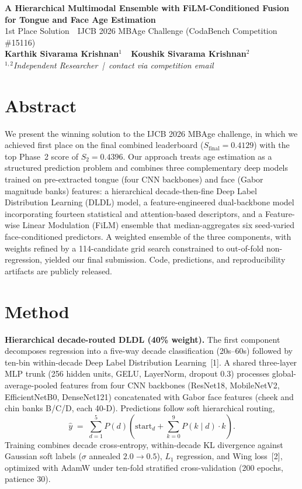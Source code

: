 \documentclass[9pt,letterpaper]{extarticle}
\begin{document}
\begin{center}
{\normalsize\bfseries\color{navyblue}
A Hierarchical Multimodal Ensemble with FiLM-Conditioned Fusion\\
for Tongue and Face Age Estimation}\\[2pt]
{\footnotesize\color{captiongray}
1st Place Solution \,\textperiodcentered\, IJCB 2026 MBAge Challenge
(CodaBench Competition \#15116)}\\[4pt]
{\small\bfseries
Karthik Sivarama Krishnan$^{1}$ \,\textperiodcentered\, Koushik Sivarama Krishnan$^{2}$}\\[1pt]
{\footnotesize\itshape
$^{1,2}$Independent Researcher \,|\, contact via competition email}
\end{center}

\section*{Abstract}
We present the winning solution to the IJCB 2026 MBAge challenge, in which we
achieved first place on the final combined leaderboard ($S_{\mathrm{final}}=0.4129$)
with the top Phase~2 score of $S_{2}=0.4396$. Our approach treats age estimation
as a structured prediction problem and combines three complementary deep models
trained on pre-extracted tongue (four CNN backbones) and face (Gabor magnitude
banks) features: a hierarchical decade-then-fine Deep Label Distribution Learning
(DLDL) model, a feature-engineered dual-backbone model incorporating fourteen
statistical and attention-based descriptors, and a Feature-wise Linear Modulation
(FiLM) ensemble that median-aggregates six seed-varied face-conditioned
predictors. A weighted ensemble of the three components, with weights refined
by a 114-candidate grid search constrained to out-of-fold non-regression, yielded
our final submission. Code, predictions, and reproducibility artifacts are
publicly released.

\section*{Method}
\textbf{Hierarchical decade-routed DLDL (40\% weight).}
The first component decomposes regression into a five-way decade classification
(20s--60s) followed by ten-bin within-decade Deep Label Distribution
Learning~[1]. A shared three-layer MLP trunk (256 hidden units,
GELU, LayerNorm, dropout 0.3) processes global-average-pooled features from four
CNN backbones (ResNet18, MobileNetV2, EfficientNetB0, DenseNet121) concatenated
with Gabor face features (cheek and chin banks B/C/D, each 40-D). Predictions
follow soft hierarchical routing,
\[
\hat{y} \;=\; \sum_{d=1}^{5} P(d)\!\left(\mathrm{start}_d + \sum_{k=0}^{9} P(k\mid d)\cdot k\right).
\]
Training combines decade cross-entropy, within-decade KL divergence against
Gaussian soft labels ($\sigma$ annealed $2.0\!\rightarrow\!0.5$), $L_1$
regression, and Wing loss~[2], optimized with AdamW under
ten-fold stratified cross-validation (200 epochs, patience 30).
\end{document}
